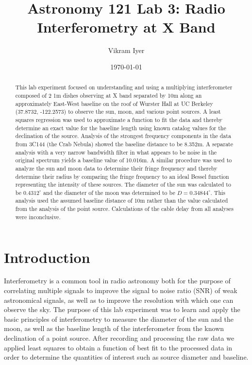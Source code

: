 \documentclass{article}
\title{Astronomy 121 Lab 3: Radio Interferometry at X Band}
\author{Vikram Iyer}
\date{\today}
\begin{document}
\maketitle


\begin{abstract}
    This lab experiment focused on understanding and using a multiplying interferometer
    composed of 2 1m dishes observing at X band separated by 10m along an approximately East-West
    baseline on the roof of Wurster Hall at UC Berkeley (37.8732, -122.2573) to
    observe the sun, moon, and various point sources. A least squares regression was
    used to approximate a function to fit the data and thereby determine an
    exact value for the baseline length using known catalog values for the
    declination of the source. Analysis of the strongest frequency components in
    the data from 3C144 (the Crab Nebula) showed the baseline distance to be
    8.352m. A separate analysis with a very narrow bandwidth filter in what
    appears to be noise in the original spectrum yields a baseline value of
    10.016m. A similar procedure was used to analyze the sun and moon data to
    determine their fringe frequency and thereby determine their radius by
    comparing the fringe frequency to an ideal Bessel function representing the
    intensity of these sources. The diameter of the sun was calculated to be
    $0.4312^{\circ}$ and
    the diameter of the moon was determined to be $D = 0.34844^{\circ}$. This
    analysis used the assumed baseline distance of 10m rather than the value
    calculated from the analysis of the point source. Calculations of the cable
    delay from all analyses were inconclusive.
\end{abstract}


\section{Introduction}
Interferometry is a common tool in radio astronomy both for the purpose of
correlating multiple signals to improve the signal to noise ratio (SNR)
of weak astronomical signals, as well as to improve the resolution with which
one can observe the sky. The purpose of this lab experiment was to learn and
apply the basic principles of interferometry to measure the diameter of the sun
and the moon, as well as the baseline length of the interferometer from the
known declination of a point source. After recording and processing the raw data
we applied least squares to obtain a function of best fit to the processed data in order to determine the quantities of interest such as source diameter and
baseline.
\end{document}
